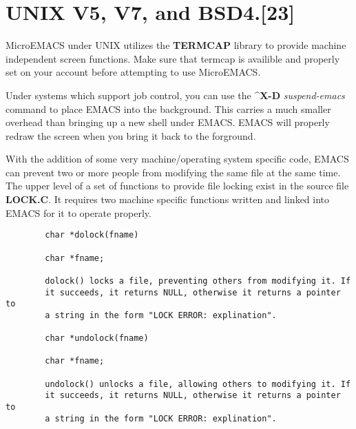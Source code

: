 \section{UNIX V5, V7, and BSD4.[23]}

MicroEMACS under UNIX utilizes the {\bf{}TERMCAP} 
library to provide machine independent screen functions.  Make sure that
termcap is availible and properly set on your account before attempting
to use MicroEMACS.

Under systems which support job control, you can use the
{\bf{}\^{}X-D} {\it{}suspend-emacs}  command to
place EMACS into the background.  This carries a much smaller overhead
than bringing up a new shell under EMACS.  EMACS will properly redraw
the screen when you bring it back to the forground.

With the addition of some very machine/operating system specific
code, EMACS can prevent two or more people from modifying the same file
at the same time.   The upper level of a set of
functions to provide file locking exist in the source file {\bf{}LOCK.C}.
It requires two machine specific functions written and linked into EMACS
for it to operate properly.

\newpage
\begin{verbatim}
        char *dolock(fname)

        char *fname;

        dolock() locks a file, preventing others from modifying it. If
        it succeeds, it returns NULL, otherwise it returns a pointer to
        a string in the form "LOCK ERROR: explination".

        char *undolock(fname)

        char *fname;

        undolock() unlocks a file, allowing others to modifying it. If
        it succeeds, it returns NULL, otherwise it returns a pointer to
        a string in the form "LOCK ERROR: explination".
\end{verbatim}

